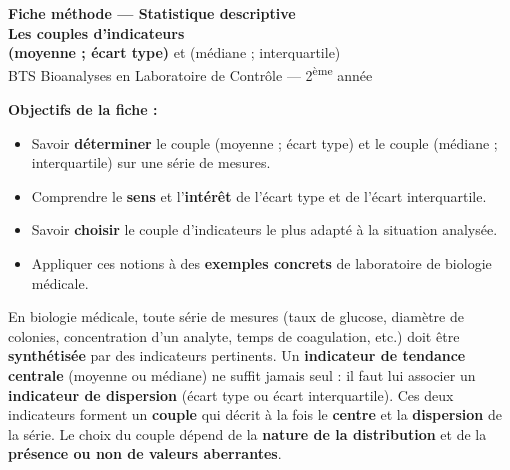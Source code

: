 \documentclass[11pt,a4paper]{article}
\title{}
\author{}
\date{}
\begin{document}

\begin{center}
  {\Large \textbf{Fiche méthode — Statistique descriptive}}\\[0.3cm]
  {\large \textbf{Les couples d'indicateurs}}\\[0.2cm]
  {\large \textbf{(moyenne ; écart type)} et (médiane ; interquartile)}\\[0.3cm]
  {\large BTS Bioanalyses en Laboratoire de Contrôle — 2\textsuperscript{ème} année}
\end{center}

\vspace{0.4cm}

\begin{consigne}
\textbf{Objectifs de la fiche :}
\begin{itemize}[leftmargin=*]
  \item Savoir \textbf{déterminer} le couple (moyenne ; écart type) et le couple (médiane ; interquartile) sur une série de mesures.
  \item Comprendre le \textbf{sens} et l'\textbf{intérêt} de l'écart type et de l'écart interquartile.
  \item Savoir \textbf{choisir} le couple d'indicateurs le plus adapté à la situation analysée.
  \item Appliquer ces notions à des \textbf{exemples concrets} de laboratoire de biologie médicale.
\end{itemize}
\end{consigne}

\vspace{0.3cm}

\begin{contexte}
En biologie médicale, toute série de mesures (taux de glucose, diamètre de colonies, concentration d'un analyte, temps de coagulation, etc.) doit être \textbf{synthétisée} par des indicateurs pertinents. Un \textbf{indicateur de tendance centrale} (moyenne ou médiane) ne suffit jamais seul : il faut lui associer un \textbf{indicateur de dispersion} (écart type ou écart interquartile). Ces deux indicateurs forment un \textbf{couple} qui décrit à la fois le \textbf{centre} et la \textbf{dispersion} de la série. Le choix du couple dépend de la \textbf{nature de la distribution} et de la \textbf{présence ou non de valeurs aberrantes}.
\end{contexte}
\end{document}

